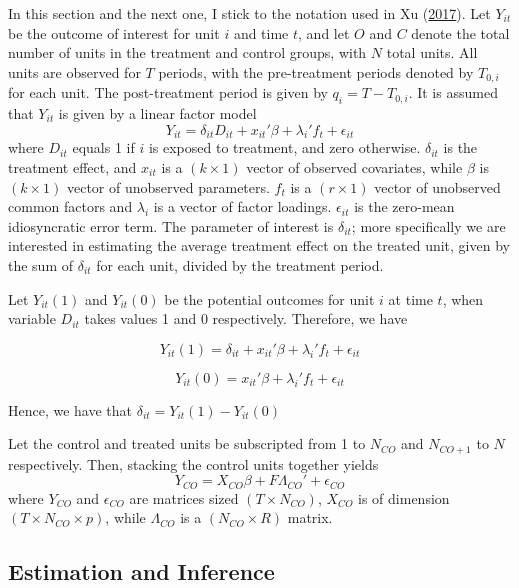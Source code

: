 \documentclass[12pt,nobind, a4paper]{reedthesis}
\begin{document}
 In this section and the next one, I stick to the notation used in Xu (\protect\hyperlink{ref-xu_generalized_2017}{2017}). Let \(Y_{it}\) be the outcome of interest for unit \(i\) and time \(t\), and let \(O\) and \(C\) denote the total number of units in the treatment and control groups, with \(N\) total units. All units are observed for \(T\) periods, with the pre-treatment periods denoted by \(T_{0, i}\) for each unit. The post-treatment period is given by \(q_{i}=T-T_{0,i}\). It is assumed that \(Y_{it}\) is given by a linear factor model
 \begin{equation}
 Y_{it}=\delta_{it} D_{it}+ x_{it}'\beta+ \lambda_{i}'f_{t}+\epsilon_{it}
 \end{equation}
 where \(D_{it}\) equals 1 if \(i\) is exposed to treatment, and zero otherwise. \(\delta_{it}\) is the treatment effect, and \(x_{it}\) is a \((k \times 1)\) vector of observed covariates, while \(\beta\) is \((k \times 1)\) vector of unobserved parameters. \(f_{t}\) is a \((r \times 1)\) vector of unobserved common factors and \(\lambda_{i}\) is a vector of factor loadings. \(\epsilon_{it}\) is the zero-mean idiosyncratic error term. The parameter of interest is \(\delta_{it}\); more specifically we are interested in estimating the average treatment effect on the treated unit, given by the sum of \(\delta_{it}\) for each unit, divided by the treatment period.
 \linebreak

 Let \(Y_{it}(1)\) and \(Y_{it}(0)\) be the potential outcomes for unit \(i\) at time \(t\), when variable \(D_{it}\) takes values 1 and 0 respectively. Therefore, we have

 \[Y_{it}(1)=\delta_{it}+ x_{it}'\beta+ \lambda_{i}'f_{t}+\epsilon_{it}\]

 \[Y_{it}(0)=x_{it}'\beta + \lambda_{i}'f_{t}+\epsilon_{it}\]

 Hence, we have that \(\delta_{it}= Y_{it}(1)-Y_{it}(0)\)

 Let the control and treated units be subscripted from 1 to \(N_{CO}\) and \(N_{CO+1}\) to \(N\) respectively. Then, stacking the control units together yields
 \begin{equation}
 Y_{CO}=X_{CO} \beta+ F \Lambda_{CO}'+\epsilon_{CO}
 \end{equation}
 where \(Y_{CO}\) and \(\epsilon_{CO}\) are matrices sized \((T \times N_{CO})\), \(X_{CO}\) is of dimension \((T \times N_{CO} \times p)\), while \(\Lambda_{CO}\) is a \((N_{CO} \times R)\) matrix.

 \hypertarget{estimation-and-inference}{%
 \subsection{Estimation and Inference}\label{estimation-and-inference}}
\end{document}
